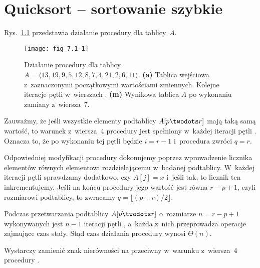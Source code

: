 \chapter{Quicksort -- sortowanie szybkie}


\exercise %

\noindent Rys.~\ref{fig:7.1-1} przedstawia działanie procedury  dla tablicy~$A$.
\begin{figure}[ht]
	\begin{center}
		\texttt{[image: fig\_7.1-1]}
	\end{center}
	\caption{Działanie procedury  dla tablicy $A=\langle13,19,9,5,12,8,7,4,21,2,6,11\rangle$. {\sffamily\bfseries(a)} Tablica wejściowa z~zaznaczonymi początkowymi wartościami zmiennych. {\sffamily\bfseries{}} Kolejne iteracje pętli  w~wierszach . {\sffamily\bfseries(m)} Wynikowa tablica $A$ po wykonaniu zamiany z~wiersza~7.} \label{fig:7.1-1}
\end{figure}

\exercise %

\noindent Zauważmy, że jeśli wszystkie elementy podtablicy $A[p\twodots r]$ mają taką samą wartość, to warunek z~wiersza~4 procedury  jest spełniony w~każdej iteracji pętli . Oznacza to, że po wykonaniu tej pętli będzie $i=r-1$ i~procedura zwróci $q=r$.

Odpowiedniej modyfikacji procedury dokonujemy poprzez wprowadzenie licznika elementów równych elementowi rozdzielającemu w~badanej podtablicy. W~każdej iteracji pętli  sprawdzamy dodatkowo, czy $A[j]=x$ i~jeśli tak, to licznik ten inkrementujemy. Jeśli na końcu procedury jego wartość jest równa $r-p+1$, czyli rozmiarowi podtablicy, to zwracamy $q=\lfloor(p+r)/2\rfloor$.

\exercise %
Podczas przetwarzania podtablicy $A[p\twodots r]$ o~rozmiarze $n=r-p+1$ wykonywanych jest $n-1$ iteracji pętli , a~każda z~nich przeprowadza operacje zajmujące czas stały. Stąd czas działania procedury  wynosi $\Theta(n)$.

\exercise %
Wystarczy zamienić znak nierówności na przeciwny w~warunku z~wiersza~4 procedury .


